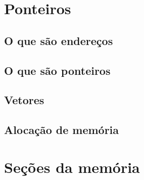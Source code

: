 

\section{Ponteiros}

\subsection{O que são endereços} \label{o-que-sao-enderecos}


\subsection{O que são ponteiros}


\subsection{Vetores}


\subsection{Alocação de memória}


\section{Seções da memória} \label{secoes-da-memoria}

